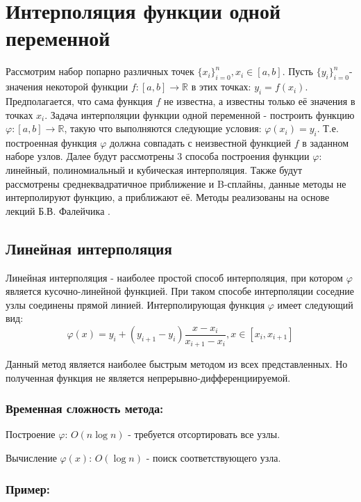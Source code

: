 \section{Интерполяция функции одной переменной}

Рассмотрим набор попарно различных точек $\{x_i\}_{i=0}^n, x_i \in [a, b]$. Пусть $\{y_i\}_{i=0}^n$- значения некоторой функции $f \colon [a,b] \to \mathbb{R}$ в этих точках: $y_i = f(x_i)$. Предполагается, что сама функция $f$ не известна, а известны только её значения в точках $x_i$. Задача интерполяции функции одной переменной - построить функцию $\varphi \colon [a, b] \to \mathbb{R}$, такую что выполняются следующие условия: $\varphi(x_i) = y_i$. Т.е. построенная функция $\varphi$ должна совпадать с неизвестной функцией $f$ в заданном наборе узлов. Далее будут рассмотрены 3 способа построения функции $\varphi$: линейный, полиномиальный и кубическая интерполяция. Также будут рассмотрены среднеквадратичное приближение и B-сплайны, данные методы не интерполируют функцию, а приближают её. Методы реализованы на основе лекций Б.В. Фалейчика \cite{faleichik2010} \cite{faleichik2012}.

\subsection{Линейная интерполяция}

Линейная интерполяция - наиболее простой способ интерполяция, при котором $\varphi$ является кусочно-линейной функцией. При таком способе интерполяции соседние узлы соединены прямой линией. Интерполирующая функция $\varphi$ имеет следующий вид:
\begin{equation}
  \varphi(x) = y_i + (y_{i+1} - y_i) \frac{x-x_i}{x_{i+1} - x_i}, x\in [x_i, x_{i+1}]
\end{equation}

Данный метод является наиболее быстрым методом из всех представленных. Но полученная функция не является непрерывно-дифференциируемой.

\subsubsection{Временная сложность метода:}

Построение $\varphi$: $ O(n \log n)$ - требуется отсортировать все узлы.

Вычисление $\varphi(x)$: $O(\log n)$ - поиск соответствующего узла.

\subsubsection{Пример:}

